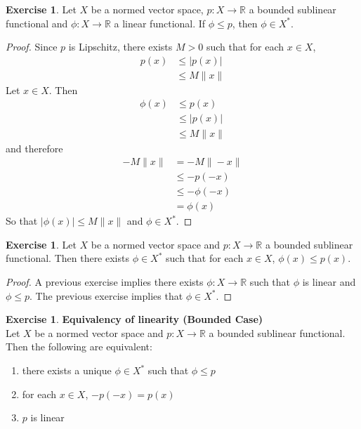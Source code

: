 \documentclass[12pt]{amsart}
\theoremstyle{definition}
\newtheorem{ex}[definition]{Exercise}
\newcommand{\R}{\mathbb{R}}
\newcommand{\lex}[1]{\label{ex:#1}}
\begin{document}
	\begin{ex} \lex{55013}
	Let $X$ be a normed vector space, $p:X \rightarrow \R$ a bounded sublinear functional and $\phi:X \rightarrow \R$ a linear functional. If $\phi \leq p$, then $\phi \in X^*$. 
	\end{ex}
	
	\begin{proof}
	Since $p$ is Lipschitz, there exists $M >0$ such that for each $x \in X$, 
	\begin{align*}
	p(x) 
	&\leq |p(x)| \\
	&\leq M \|x\|
	\end{align*}
	Let $x \in X$. Then 
	\begin{align*}
	\phi(x) 
	&\leq p(x) \\
	&\leq |p(x)| \\
	&\leq M \|x\| 
	\end{align*}
	and therefore  
	\begin{align*}
	- M \|x\| 
	&= -M \|-x\| \\
	& \leq -p(-x) \\
	& \leq - \phi(-x) \\
	&= \phi(x) 
	\end{align*}
	So that $|\phi(x)| \leq  M\|x\|$ and $\phi \in X^*$.
	\end{proof}
	
	\begin{ex} \lex{55014}
	Let $X$ be a normed vector space and $p:X \rightarrow \R$ a bounded sublinear functional. Then there exists $\phi \in X^*$ such that for each $x \in X$, $\phi(x) \leq p(x)$.
	\end{ex}
	
	\begin{proof}
	A previous exercise implies there exists $\phi: X \rightarrow \R$ such that $\phi$ is linear and $\phi \leq p$. The previous exercise implies that $\phi \in X^*$.
	\end{proof}
	
	\begin{ex} \lex{55015} \textbf{Equivalency of linearity (Bounded Case)}\\
	Let $X$ be a normed vector space and $p:X \rightarrow \R$ a bounded sublinear functional. Then the following are equivalent:
	\begin{enumerate}
	\item there exists a unique $\phi \in X^*$ such that $\phi \leq p$
	\item for each $x \in X$, $-p(-x) = p(x)$
	\item $p$ is linear
\end{enumerate}	
	\end{ex}
	
\end{document}
